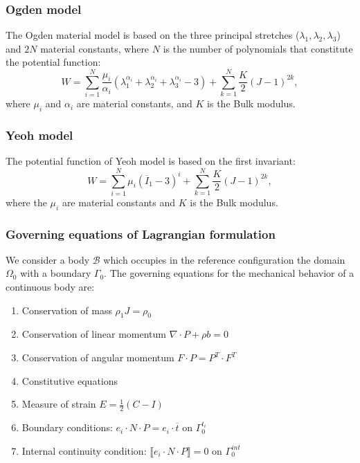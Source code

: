 \subsubsection*{Ogden model}
The Ogden \citep{ogden_large_1972} material model is based on the three principal stretches ($\lambda_1,\lambda_2,\lambda_3$) and $2N$ material constants, where $N$ is the number of polynomials that constitute the potential function:
\begin{equation}
\label{eq:ogdenmodel}
W= \sum^N_{i = 1} \frac{\mu_i}{\alpha_i}(\lambda_1^{\alpha_i}+\lambda_2^{\alpha_i}+\lambda_3^{\alpha_i}-3) + \sum_{k=1}^N \frac{K}{2}(J-1)^{2k},
\end{equation}
where $\mu_i$ and $\alpha_i$ are material constants, and $K$ is the Bulk modulus.

\subsubsection*{Yeoh model}
The potential function of Yeoh \citep{yeoh_characterization_1990} model is based on the first invariant:
\begin{equation}
\label{eq:yeohmodel}
W = \sum_{i=1}^N \mu_i(\overline{I}_1 - 3)^i + \sum_{k=1}^N \frac{K}{2}(J-1)^{2k},
\end{equation}
where the $\mu_i$ are material constants and $K$ is the Bulk modulus.

\subsubsection*{Governing equations of Lagrangian formulation} 
We consider a body $\mathcal{B}$ which occupies in the reference configuration the domain $\Omega_0$ with a boundary $\Gamma_0$. The governing equations for the mechanical behavior of a continuous body are:
\begin{enumerate}
\item Conservation of mass $\rho_1 J = \rho_0$
\item Conservation of linear momentum $\nabla \cdot P + \rho b = 0$
\item Conservation of angular momentum $F \cdot P = P^T \cdot F^T$
\item Constitutive equations
\item Measure of strain $E = \frac{1}{2} (C-I)$
\item Boundary conditions: $e_i \cdot N \cdot P = e_i \cdot \overline{t}$ on $\Gamma_0^{t_i}$
\item Internal continuity condition: $\llbracket e_i \cdot N \cdot P \rrbracket = 0$ on $\Gamma_0^{int}$
\end{enumerate} 

